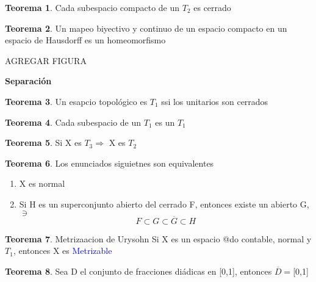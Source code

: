 \documentclass{article}
\theoremstyle{definition}
\newtheorem{theorem}{Teorema}[section]
\begin{document}

\begin{theorem}

	Cada subespacio compacto de un $T_2$ es cerrado
\end{theorem}


\begin{theorem}
	Un mapeo biyectivo y continuo de un espacio compacto en un espacio de Hausdorff es un homeomorfismo
	
	AGREGAR FIGURA
\end{theorem}


\textbf{Separación}
\begin{theorem}
	Un esapcio topológico es $T_1$ ssi los unitarios son cerrados
\end{theorem}


\begin{theorem}
	Cada subespacio de un $T_1$ es un $T_1$
\end{theorem}


\begin{theorem}
	Si X es $T_3\Rightarrow$ X es $T_2$
\end{theorem}


\begin{theorem}

	Los enunciados siguietnes son equivalentes
	\begin{enumerate}
		\item X es normal
		\item Si H es un superconjunto abierto del cerrado F, entonces existe un abierto G, $\ni$
		\[F\subset G\subset \overline{G}\subset H\]
	\end{enumerate}
\end{theorem}


\begin{theorem}{Metrizaacion de Urysohn}
	Si X es un espacio @do contable, normal y $T_1$, entonces X es \textcolor{blue}{Metrizable}
\end{theorem}


\begin{theorem}
	Sea D el conjunto de fracciones diádicas en [0,1], entonces $\overline{D}=$[0,1]
\end{theorem}
\end{document}

